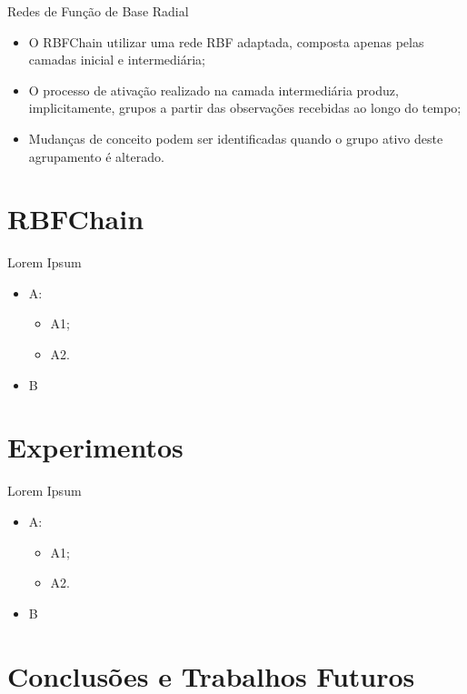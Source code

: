 \documentclass[10pt]{beamer}
\begin{document}
\begin{frame}{Redes de Função de Base Radial}
    \begin{itemize}
        \item<1 -> O RBFChain utilizar uma rede RBF adaptada, composta apenas pelas camadas inicial e intermediária;
        \item<2 -> O processo de ativação realizado na camada intermediária produz, implicitamente, grupos a partir das observações recebidas ao longo do tempo;
        \item<3 -> Mudanças de conceito podem ser identificadas quando o grupo ativo deste agrupamento é alterado.
      \end{itemize}
\end{frame}


\section{RBFChain}

\begin{frame}{Lorem Ipsum}
    \begin{itemize}
        \item<1 -> A:
        \begin{itemize}
            \item<2 -> A1;
            \item<2 -> A2.
        \end{itemize}
        \item<3 -> B
      \end{itemize}
\end{frame}

\section{Experimentos}

\begin{frame}{Lorem Ipsum}
    \begin{itemize}
        \item<1 -> A:
        \begin{itemize}
            \item<2 -> A1;
            \item<2 -> A2.
        \end{itemize}
        \item<3 -> B
      \end{itemize}
\end{frame}

\section{Conclusões e Trabalhos Futuros}
\end{document}

